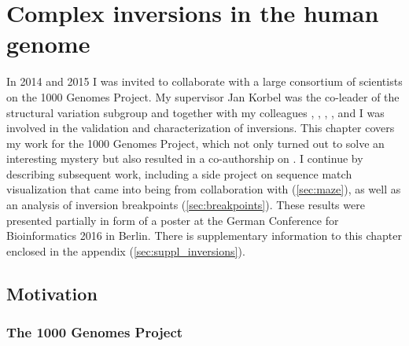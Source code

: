 \chapter{Complex inversions in the human genome}
\label{sec:complex_invs}


In 2014 and 2015 I was invited to collaborate with a large consortium of
scientists on the 1000 Genomes Project. My supervisor Jan Korbel was the
co-leader of the structural variation subgroup and together with my colleagues
\tobias, \adrian, \benjamin, \markus, and \andreas
I was involved in the validation and characterization of inversions.
This chapter covers my work for the 1000 Genomes Project, which not only turned
out to solve an interesting mystery but also resulted in a co-authorship on
\cite{Sudmant2015}. I continue by describing subsequent work, including a side
project on sequence match visualization that came into being from collaboration
with \markus (\cref{sec:maze}), as well as an analysis of inversion breakpoints
(\cref{sec:breakpoints}). These results were presented partially in form of a
poster at the German Conference for
Bioinformatics 2016 in Berlin. There is supplementary information to this
chapter enclosed in the appendix (\cref{sec:suppl_inversions}).





\section{Motivation}
\subsection{The 1000 Genomes Project}
\label{sec:1000G}

